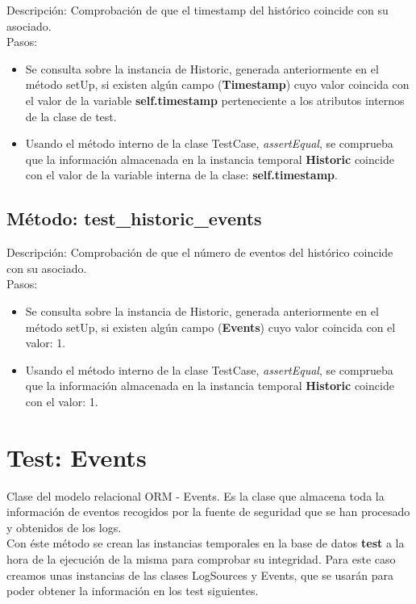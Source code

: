 Descripción: Comprobación de que el timestamp del histórico coincide con su asociado.\\
Pasos:
\begin{itemize}
\item Se consulta sobre la instancia de Historic, generada anteriormente en el método setUp, si existen algún campo (\textbf{Timestamp}) cuyo valor coincida con el valor de la variable \textbf{self.timestamp} perteneciente a los atributos internos de la clase de test.
\item Usando el método interno de la clase TestCase, \emph{assertEqual}, se comprueba que la información almacenada en la instancia temporal \textbf{Historic} coincide con el valor de la variable interna de la clase: \textbf{self.timestamp}.
\end{itemize}



\subsection{\quad Método: test\_historic\_events}

Descripción: Comprobación de que el número de eventos del histórico coincide con su asociado.\\
Pasos:
\begin{itemize}
\item Se consulta sobre la instancia de Historic, generada anteriormente en el método setUp, si existen algún campo (\textbf{Events}) cuyo valor coincida con el valor: 1.
\item Usando el método interno de la clase TestCase, \emph{assertEqual}, se comprueba que la información almacenada en la instancia temporal \textbf{Historic} coincide con el valor: 1.
\end{itemize}



\section{\quad Test: Events}

Clase del modelo relacional ORM - Events. Es la clase que almacena toda la información de eventos recogidos por la fuente de seguridad que se han procesado y obtenidos de los logs.\\

Con éste método se crean las instancias temporales en la base de datos \textbf{test} a la hora de la ejecución de la misma para comprobar su integridad. Para este caso creamos unas instancias de las clases LogSources y Events, que se usarán para poder obtener la información en los test siguientes.\\

